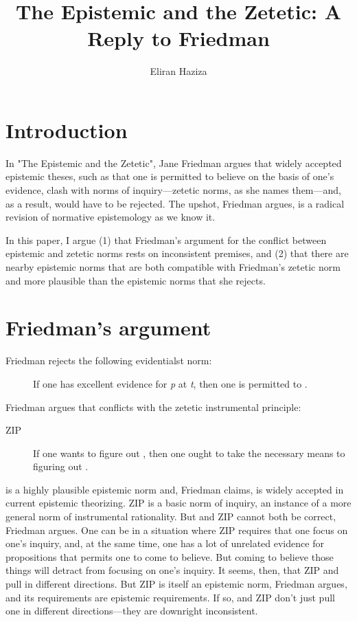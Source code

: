 \documentclass[12pt]{article}
\title{The Epistemic and the Zetetic: A Reply to Friedman}
\author{Eliran Haziza}
\begin{document}
\maketitle

\section{Introduction}

In "The Epistemic and the Zetetic", Jane Friedman argues that widely accepted epistemic theses, such as that one is permitted to believe on the basis of one's evidence, clash with norms of inquiry---zetetic norms, as she names them---and, as a result, would have to be rejected. The upshot, Friedman argues, is a radical revision of normative epistemology as we know it.

In this paper, I argue (1) that Friedman's argument for the conflict between epistemic and zetetic norms rests on inconsistent premises, and (2) that there are nearby epistemic norms that are both compatible with Friedman's zetetic norm and more plausible than the epistemic norms that she rejects.

\section{Friedman's argument}\label{sec:2}

Friedman rejects the following evidentialst norm:

\begin{description}
    \item[\ep] If one has excellent evidence for \textit{p} at \textit{t}, then one is permitted to \jud{}.
\end{description}
%
Friedman argues that \ep{} conflicts with the zetetic instrumental principle:
%
\begin{description}
    \item[ZIP] If one wants to figure out , then one ought to take the necessary means to figuring out .
\end{description}
%
\ep{} is a highly plausible epistemic norm and, Friedman claims, is widely accepted in current epistemic theorizing. ZIP is a basic norm of inquiry, an instance of a more general norm of instrumental rationality. But \ep{} and ZIP cannot both be correct, Friedman argues. One can be in a situation where ZIP requires that one focus on one’s inquiry, and, at the same time, one has a lot of unrelated evidence for propositions that \ep{} permits one to come to believe. But coming to believe those things will detract from focusing on one’s inquiry. It seems, then, that ZIP and \ep{} pull in different directions. But ZIP is itself an epistemic norm, Friedman argues, and its requirements are epistemic requirements. If so, \ep{} and ZIP don’t just pull one in different directions---they are downright inconsistent.
\end{document}
